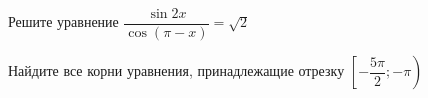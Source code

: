 \begin{ex}
	\begin{condition}
		\begin{enumcols}[label=\asbuk*)]
			\item Решите уравнение \( \dfrac{\sin 2x}{\cos (\pi - x)} = \sqrt{2} \)
			\item Найдите все корни уравнения, принадлежащие отрезку \( \left[-\dfrac{5\pi}{2};-\pi\right) \)
		\end{enumcols}
	\end{condition}
\end{ex}